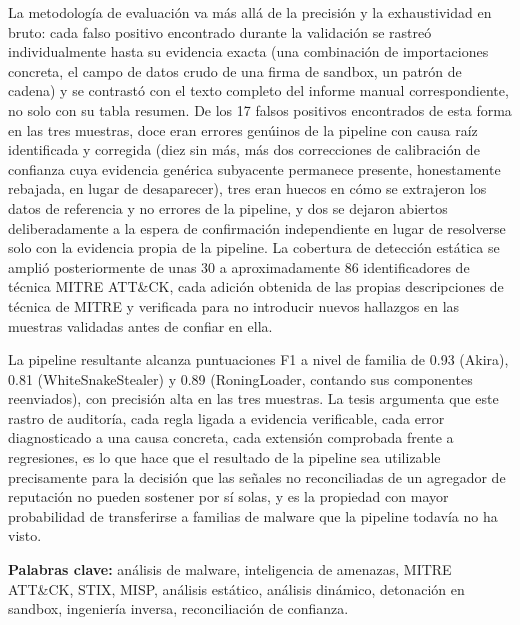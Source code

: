 La metodolog\'ia de evaluaci\'on va m\'as all\'a de la precisi\'on y la
exhaustividad en bruto: cada falso positivo encontrado durante la
validaci\'on se rastre\'o individualmente hasta su evidencia exacta
(una combinaci\'on de importaciones concreta, el campo de datos crudo
de una firma de sandbox, un patr\'on de cadena) y se contrast\'o con el
texto completo del informe manual correspondiente, no solo con su
tabla resumen. De los 17 falsos positivos encontrados de esta forma en
las tres muestras, doce eran errores gen\'uinos de la pipeline con
causa ra\'iz identificada y corregida (diez sin m\'as, m\'as dos
correcciones de calibraci\'on de confianza cuya evidencia gen\'erica
subyacente permanece presente, honestamente rebajada, en lugar de
desaparecer), tres eran huecos en c\'omo se extrajeron los datos de
referencia y no errores de la pipeline, y dos se dejaron abiertos
deliberadamente a la espera de confirmaci\'on independiente en lugar
de resolverse solo con la evidencia propia de la pipeline. La
cobertura de detecci\'on est\'atica se ampli\'o posteriormente de unas
30 a aproximadamente 86 identificadores de t\'ecnica MITRE ATT\&CK,
cada adici\'on obtenida de las propias descripciones de t\'ecnica de
MITRE y verificada para no introducir nuevos hallazgos en las muestras
validadas antes de confiar en ella.

La pipeline resultante alcanza puntuaciones F1 a nivel de familia de
0.93 (Akira), 0.81 (WhiteSnakeStealer) y 0.89 (RoningLoader, contando
sus componentes reenviados), con precisi\'on alta en las
tres muestras. La tesis argumenta que este rastro de auditor\'ia, cada
regla ligada a evidencia verificable, cada error diagnosticado a una
causa concreta, cada extensi\'on comprobada frente a regresiones, es lo
que hace que el resultado de la pipeline sea utilizable precisamente
para la decisi\'on que las se\~nales no reconciliadas de un agregador de
reputaci\'on no pueden sostener por s\'i solas, y es la propiedad con
mayor probabilidad de transferirse a familias de malware que la
pipeline todav\'ia no ha visto.

\bigskip
\noindent\textbf{Palabras clave:} an\'alisis de malware, inteligencia
de amenazas, MITRE ATT\&CK, STIX, MISP, an\'alisis est\'atico,
an\'alisis din\'amico, detonaci\'on en sandbox, ingenier\'ia inversa,
reconciliaci\'on de confianza.
